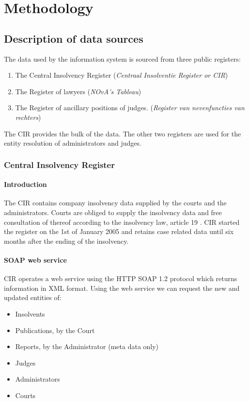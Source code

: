 \section{Methodology}
\subsection{Description of data sources}
The data used by the information system is sourced from three public registers:
\begin{enumerate}
	\item The Central Insolvency Register (\textit{Centraal Insolventie Register or CIR})
	\item The Register of lawyers (\textit{NOvA's Tableau}) 
	\item The Register of ancillary positions of judges. (\textit{Register van nevenfuncties van rechters}) 
\end{enumerate}
	
The CIR provides the bulk of the data. The other two registers are used for the entity resolution of administrators and judges.

\subsubsection{Central Insolvency Register}
\paragraph{Introduction}
The CIR \cite{rechtspraak:1} contains company insolvency data supplied by the courts and the administrators. Courts are obliged to supply the insolvency data and free consultation of thereof according to the insolvency law, article 19 \cite{law:1}. CIR started the register on the 1st of January 2005 and retains case related data until six months after the ending of the insolvency. 

\paragraph{SOAP web service}
CIR operates a web service using the HTTP SOAP 1.2 protocol which returns information in XML format. Using the web service we can request the new and updated entities of:

\begin{itemize}
	\item Insolvents
	\item Publications, by the Court
	\item Reports, by the Administrator (meta data only)
	\item Judges 
	\item Administrators
	\item Courts
\end{itemize}

